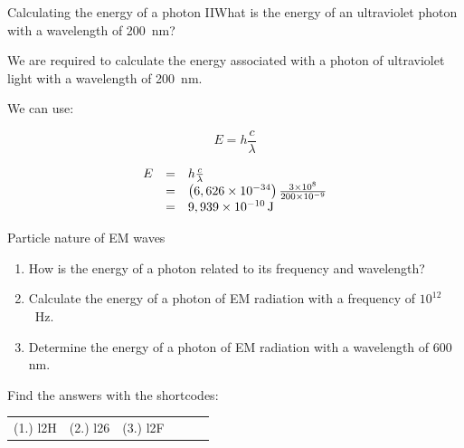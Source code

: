   \begin{wex}{Calculating the energy of a photon II}{What is the energy of an ultraviolet photon with a wavelength of 200~nm?}{
      \label{m38778*id189184}We are required to calculate the energy associated with a photon of ultraviolet light with a wavelength of 200~nm.\par 
      \label{m38778*id189190}We can use:\par 
      \label{m38778*id189193}\nopagebreak\noindent{}
        
    \begin{equation}
    E=h\frac{c}{\lambda }
      \end{equation}
      \label{m38778*id189220}\nopagebreak\noindent{}
    
    \begin{equation}
    \begin{array}{ccc}\hfill E& =& h\frac{c}{\lambda }\hfill \\ & =& \left(6,626\ensuremath{\times}{10}^{-34}\right)\frac{3\ensuremath{\times}{10}^{8}}{200\ensuremath{\times}{10}^{-9}}\hfill \\ & =& 9,939\ensuremath{\times}{10}^{-10}\phantom{\rule{0.166667em}{0ex}}\text{J}\hfill \end{array}
      \end{equation}}
         \end{wex}
      \label{m38778*uid13}
            \begin{exercises}{Particle nature of EM waves}
            \nopagebreak
        \label{m38778*id189384}\begin{enumerate}[noitemsep, label=\textbf{\arabic*}. ] 
            \label{m38778*uid14}\item How is the energy of a photon related to its frequency and wavelength?\newline
\label{m38778*uid15}\item Calculate the energy of a photon of EM radiation with a frequency of ${10}^{12}$~Hz.\newline
\label{m38778*uid16}\item Determine the energy of a photon of EM radiation with a wavelength of 600 nm.\newline
\end{enumerate}
  \label{m38778**end}
\par {} Find the answers with the shortcodes:
 \par \begin{tabular}[h]{cccccc}
 (1.) l2H  &  (2.) l26  &  (3.) l2F  & \end{tabular}
\end{exercises}
            
